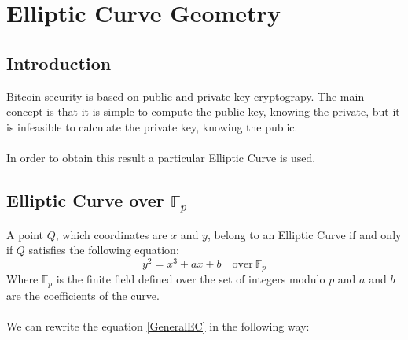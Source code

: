 
\chapter{Elliptic Curve Geometry} %

\label{EC} %


\newcommand{\keyword}[1]{\textbf{#1}}
\newcommand{\tabhead}[1]{\textbf{#1}}
\newcommand{\code}[1]{\texttt{#1}}
\newcommand{\file}[1]{\texttt{\bfseries#1}}
\newcommand{\option}[1]{\texttt{\itshape#1}}


\section{Introduction}
Bitcoin security is based on public and private key cryptograpy. The main concept is that it is simple to compute the public key, knowing the private, but it is infeasible to calculate the private key, knowing the public. \\ \\
In order to obtain this result a particular Elliptic Curve is used.

\section{Elliptic Curve over $\mathbb{F}_p$}

A point $Q$, which coordinates are $x$ and $y$, belong to an Elliptic Curve if and only if $Q$ satisfies the following equation:
\begin{equation}\label{GeneralEC}
y^2=x^3+ax+b \quad \textrm{over} \ \mathbb{F}_p
\end{equation}
Where $\mathbb{F}_p$ is the finite field defined over the set of integers modulo $p$ and $a$ and $b$ are the coefficients of the curve. \\ \\
We can rewrite the equation \ref{GeneralEC} in the following way:

